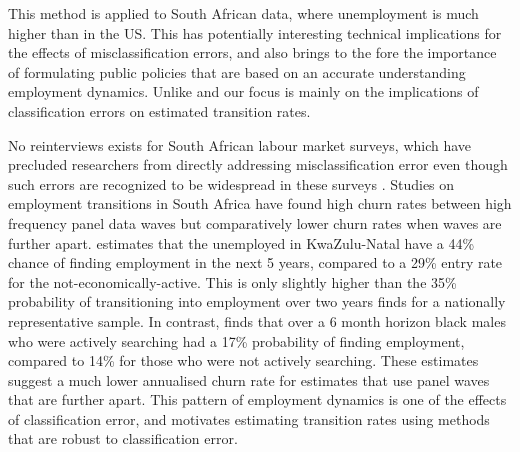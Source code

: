 \documentclass[letterpaper,12pt,final,dvipsnames]{article}
\begin{document}
This method is applied to South African data, where unemployment is much higher than in the US. This has potentially interesting technical implications for the effects of misclassification errors, and also brings to the fore the importance of formulating public policies that are based on an accurate understanding employment dynamics. Unlike \cite{biemer2000} and \cite{feng2013} our focus is mainly on the implications of classification errors on estimated transition rates.

No reinterviews exists for South African labour market surveys, which have precluded researchers from directly addressing misclassification error even though such errors are recognized to be widespread in these surveys \citep{aguero2007,dinkelman2004,ashenfelter1986}. Studies on employment transitions in South Africa have found high churn rates between high frequency panel data waves but comparatively lower churn rates when waves are further apart. \cite{dinkelman2004} estimates that the unemployed in KwaZulu-Natal have a 44\% chance of finding employment in the next 5 years, compared to a 29\% entry rate for the not-economically-active. This is only slightly higher than the 35\% probability of transitioning into employment over two years \cite{cichello2014} finds for a nationally representative sample. In contrast, \cite{banerjee2008} finds that over a 6 month horizon black males who were actively searching had a 17\% probability of finding employment, compared to 14\%  for those who were not actively searching. These estimates suggest a much lower annualised churn rate for estimates that use panel waves that are further apart. This pattern of employment dynamics is one of the effects of classification error, and motivates estimating transition rates using methods that are robust to classification error. 





\end{document}

